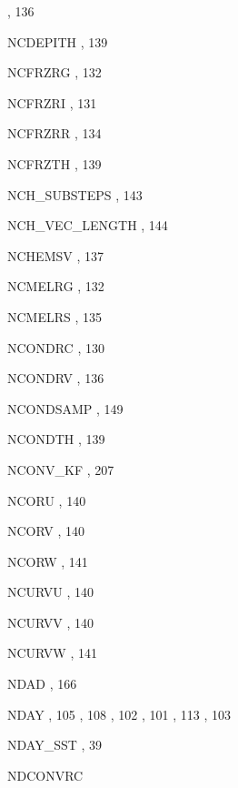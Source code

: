 \begin{theindex}
    \subitem {},  136
  \item NCDEPITH
    \subitem {},  139
  \item NCFRZRG
    \subitem {},  132
  \item NCFRZRI
    \subitem {},  131
  \item NCFRZRR
    \subitem {},  134
  \item NCFRZTH
    \subitem {},  139
  \item NCH\_SUBSTEPS
    \subitem {},  143
  \item NCH\_VEC\_LENGTH
    \subitem {},  144
  \item NCHEMSV
    \subitem {},  137
  \item NCMELRG
    \subitem {},  132
  \item NCMELRS
    \subitem {},  135
  \item NCONDRC
    \subitem {},  130
  \item NCONDRV
    \subitem {},  136
  \item NCONDSAMP
    \subitem {},  149
  \item NCONDTH
    \subitem {},  139
  \item NCONV\_KF
    \subitem {},  207
  \item NCORU
    \subitem {},  140
  \item NCORV
    \subitem {},  140
  \item NCORW
    \subitem {},  141
  \item NCURVU
    \subitem {},  140
  \item NCURVV
    \subitem {},  140
  \item NCURVW
    \subitem {},  141
  \item NDAD
    \subitem {},  166
  \item NDAY
    \subitem {},  105
    \subitem {},  108
    \subitem {},  102
    \subitem {},  101
    \subitem {},  113
    \subitem {},  103
  \item NDAY\_SST
    \subitem {},  39
  \item NDCONVRC

\end{theindex}
